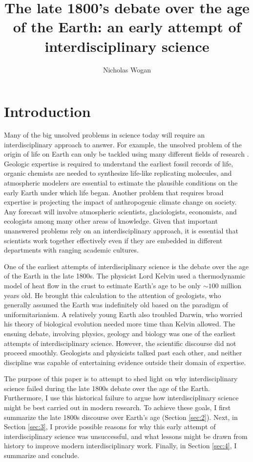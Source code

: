 \documentclass[12pt]{article}
\begin{document}
\title{The late 1800's debate over the age of the Earth: an early attempt of interdisciplinary science}
\author{Nicholas Wogan}
\maketitle

\section{Introduction}


Many of the big unsolved problems in science today will require an interdisciplinary approach to answer. For example, the unsolved problem of the origin of life on Earth can only be tackled using many different fields of research \citep{Hays_2015}. Geologic expertise is required to understand the earliest fossil records of life, organic chemists are needed to synthesize life-like replicating molecules, and atmospheric modelers are essential to estimate the plausible conditions on the early Earth under which life began. Another problem that requires broad expertise is projecting the impact of anthropogenic climate change on society. Any forecast will involve atmospheric scientists, glaciologists, economists, and ecologists among many other areas of knowledge. Given that important unanswered problems rely on an interdisciplinary approach, it is essential that scientists work together effectively even if they are embedded in different departments with ranging academic cultures.

One of the earliest attempts of interdisciplinary science is the debate over the age of the Earth in the late 1800s. The physicist Lord Kelvin used a thermodynamic model of heat flow in the crust to estimate Earth's age to be only $\sim 100$ million years old. He brought this calculation to the attention of geologists, who generally assumed the Earth was indefinitely old based on the paradigm of uniformitarianism. A relatively young Earth also troubled Darwin, who worried his theory of biological evolution needed more time than Kelvin allowed. The ensuing debate, involving physics, geology and biology was one of the earliest attempts of interdisciplinary science. However, the scientific discourse did not proceed smoothly. Geologists and physicists talked past each other, and neither discipline was capable of entertaining evidence outside their domain of expertise.

The purpose of this paper is to attempt to shed light on why interdisciplinary science failed during the late 1800s debate over the age of the Earth. Furthermore, I use this historical failure to argue how interdisciplinary science might be best carried out in modern research. To achieve these goals, I first summarize the late 1800s discourse over Earth's age (Section \ref{sec:2}). Next, in Section \ref{sec:3}, I provide possible reasons for why this early attempt of interdisciplinary science was unsuccessful, and what lessons might be drawn from history to improve modern interdisciplinary work. Finally, in Section \ref{sec:4}, I summarize and conclude.
\end{document}
